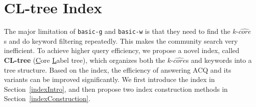 \section{CL-tree Index}
\label{index}
The major limitation of {\tt basic-g} and {\tt basic-w} is that
they need to find the $k$-$\widehat {core}$s and do keyword filtering repeatedly.
This makes the community search very inefficient.
To achieve higher query efficiency, we propose a novel index,
called \textbf{CL-tree} (\underline{C}ore \underline{L}abel tree),
which organizes both the $k$-$\widehat {core}$s and keywords into a tree structure.
Based on the index, the efficiency of answering ACQ and its variants
can be improved significantly.
We first introduce the index in Section~\ref{indexIntro},
and then propose two index construction methods in Section~\ref{indexConstruction}.





